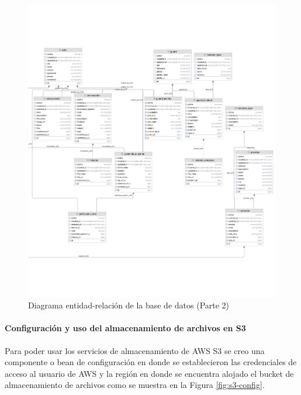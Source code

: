 \begin{figure}[H]
    \centering
    \includegraphics[width=1\textwidth]{resources/images/diagram-2}
    \caption{Diagrama entidad-relación de la base de datos (Parte 2)}
    \label{fig:er-diagram-2}
\end{figure}

\newpage

\paragraph{Configuración y uso del almacenamiento de archivos en S3}

Para poder usar los servicios de almacenamiento de AWS S3 se creo una componente o bean de configuración en donde se establecieron las credenciales de acceso al usuario de AWS y la región en donde se encuentra alojado el bucket de almacenamiento de archivos como se muestra en la Figura \ref{fig:s3-config}.

